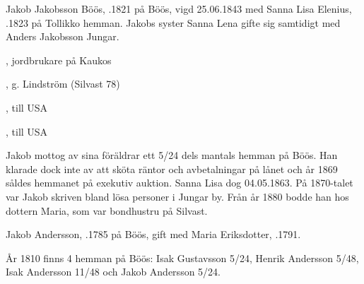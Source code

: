 %
Jakob Jakobsson Böös, .1821 på Böös, vigd 25.06.1843 med Sanna Lisa Elenius, .1823 på Tollikko hemman. Jakobs syster Sanna Lena gifte sig samtidigt med Anders Jakobsson Jungar.
\begin{jhchildren}
  \item {}, jordbrukare på Kaukos
  \item {}, g. Lindström (Silvast 78)
  \item {}
  \item {}, till USA
  \item {}
  \item {}
  \item {}, till USA
\end{jhchildren}
Jakob mottog av sina föräldrar ett 5/24 dels mantals hemman på Böös. Han klarade dock inte av att sköta räntor och avbetalningar på lånet och år 1869 såldes hemmanet på exekutiv auktion. Sanna Lisa dog 04.05.1863. På 1870-talet var Jakob skriven bland lösa personer i Jungar by. Från år 1880 bodde han hos dottern Maria, som var bondhustru på Silvast.

%
Jakob Andersson, .1785 på Böös, gift med Maria Eriksdotter, .1791.
\begin{jhchildren}
  \item {}
  \item {}
  \item {}
  \item {}
  \item {}
  \item {}
\end{jhchildren}
År 1810 finns 4 hemman på Böös: Isak Gustavsson 5/24, Henrik Andersson 5/48, Isak Andersson 11/48 och Jakob Andersson 5/24.



